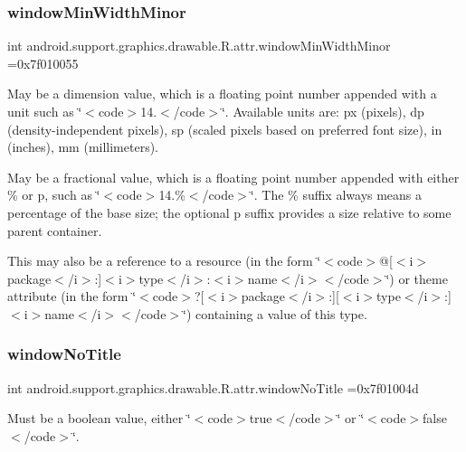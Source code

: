 \subsubsection{\texorpdfstring{window\+Min\+Width\+Minor}{windowMinWidthMinor}}
{\footnotesize\ttfamily int android.\+support.\+graphics.\+drawable.\+R.\+attr.\+window\+Min\+Width\+Minor =0x7f010055\hspace{0.3cm}{\ttfamily [static]}}

May be a dimension value, which is a floating point number appended with a unit such as \char`\"{}$<$code$>$14.\+5sp$<$/code$>$\char`\"{}. Available units are\+: px (pixels), dp (density-\/independent pixels), sp (scaled pixels based on preferred font size), in (inches), mm (millimeters). 

May be a fractional value, which is a floating point number appended with either \% or p, such as \char`\"{}$<$code$>$14.\%$<$/code$>$\char`\"{}. The \% suffix always means a percentage of the base size; the optional p suffix provides a size relative to some parent container. 

This may also be a reference to a resource (in the form \char`\"{}$<$code$>$@\mbox{[}$<$i$>$package$<$/i$>$\+:\mbox{]}$<$i$>$type$<$/i$>$\+:$<$i$>$name$<$/i$>$$<$/code$>$\char`\"{}) or theme attribute (in the form \char`\"{}$<$code$>$?\mbox{[}$<$i$>$package$<$/i$>$\+:\mbox{]}\mbox{[}$<$i$>$type$<$/i$>$\+:\mbox{]}$<$i$>$name$<$/i$>$$<$/code$>$\char`\"{}) containing a value of this type. \mbox{\label{classandroid_1_1support_1_1graphics_1_1drawable_1_1R_1_1attr_a2aac649597814fa3c9f5f63575e0466f}} 
\subsubsection{\texorpdfstring{window\+No\+Title}{windowNoTitle}}
{\footnotesize\ttfamily int android.\+support.\+graphics.\+drawable.\+R.\+attr.\+window\+No\+Title =0x7f01004d\hspace{0.3cm}{\ttfamily [static]}}

Must be a boolean value, either \char`\"{}$<$code$>$true$<$/code$>$\char`\"{} or \char`\"{}$<$code$>$false$<$/code$>$\char`\"{}. 

